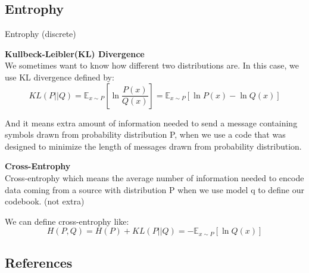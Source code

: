 \documentclass{bredelebeamer}
\begin{document}
\subsection{Entrophy}
\begin{frame}{Entrophy (discrete)}
  \begin{justify}
    \textbf{Kullbeck-Leibler(KL) Divergence}\\
    We sometimes want to know how different two distributions are. In this case,
    we use KL divergence defined by:
    \begin{equation}
      KL(P||Q) = \mathbb{E}_{x \sim P}[\ln \frac{P(x)}{Q(x)}] = \mathbb{E}_{x \sim P}[\ln P(x) - \ln Q(x)]
    \end{equation}

    And it means extra amount of information needed to send a message containing
    symbols drawn from probability distribution P, when we use a code that was
    designed to minimize the length of messages drawn from probability distribution.

    \textbf{Cross-Entrophy}~\cite{Goodfellow-et-al-2016}\\
    Cross-entrophy which means the average number of information needed to encode
    data coming from a source with distribution P when we use model q to define our
    codebook. (not extra)

    \vspace{0.5\baselineskip}
    We can define cross-entrophy like:
    \begin{equation}
      H(P,Q) = H(P) + KL(P||Q) = -\mathbb{E}_{x \sim P}[\ln Q(x)]
    \end{equation}
  \end{justify}
\end{frame}





\printbibliography\subsection{References}
\end{document}
